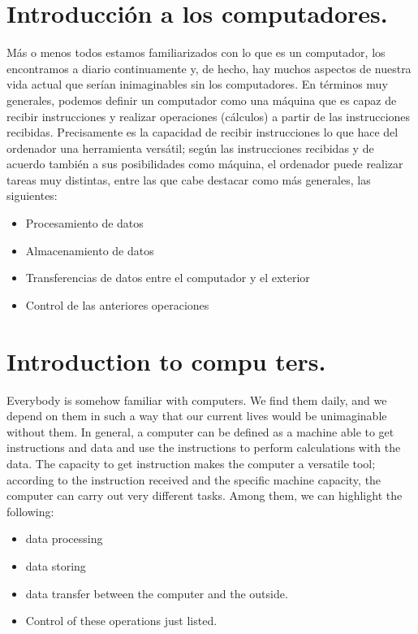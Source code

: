 \begin{paracol}{2}
\section[Introducción a los computadores.]{Introducción a los com\-putadores.}
Más o menos todos estamos familiarizados con lo que es un computador, los encontramos a diario continuamente  y, de hecho, hay muchos aspectos de nuestra vida actual que serían inimaginables sin los computadores.  En términos muy generales, podemos definir un computador como una máquina que es capaz de recibir instrucciones y realizar operaciones (cálculos) a partir de las instrucciones recibidas. Precisamente es la capacidad de recibir instrucciones lo que hace del ordenador una herramienta versátil; según las instrucciones recibidas y de acuerdo también a sus posibilidades como máquina,  el ordenador puede realizar tareas muy distintas, entre las que cabe destacar como más generales, las siguientes:
\begin{itemize}
\item Procesamiento de datos 
\item Almacenamiento de datos
\item Transferencias de datos entre el computador y el exterior
\item Control de las anteriores operaciones
\end{itemize}

\switchcolumn
\section{Introduction to compu\- ters.}
Everybody is somehow familiar with computers. We find them daily, and we depend on them in such a way that our current lives would be unimaginable without them. In general, a computer can be defined as a machine able to get instructions and data and use the instructions to perform calculations with the data. The capacity to get instruction makes the computer a versatile tool; according to the instruction received and the specific machine capacity, the computer can carry out very different tasks. Among them, we can highlight the following:
\begin{itemize}
\item data processing
\item data storing
\item data transfer between the computer and the outside.
\item Control of these operations just listed.
\end{itemize}    


\end{paracol}
